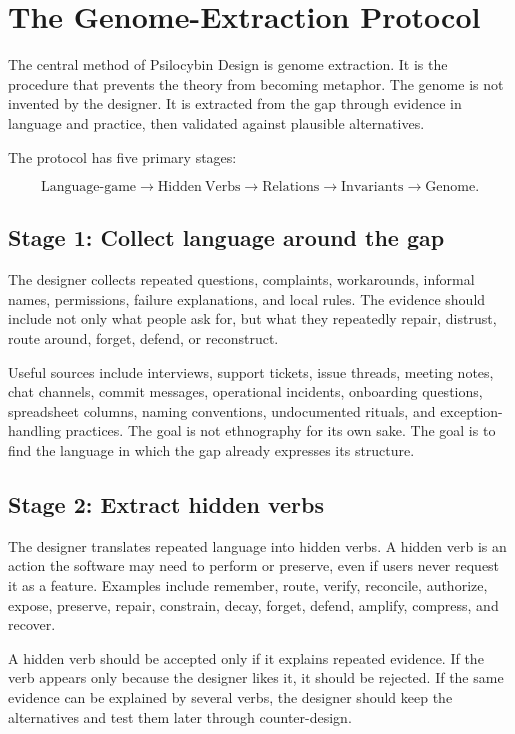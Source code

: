 \documentclass[11pt]{article}
\begin{document}
\section{The Genome-Extraction Protocol}

The central method of Psilocybin Design is genome extraction. It is the procedure that prevents the theory from becoming metaphor. The genome is not invented by the designer. It is extracted from the gap through evidence in language and practice, then validated against plausible alternatives.

The protocol has five primary stages:

\[
    \mathrm{Language\mbox{-}game} \rightarrow \mathrm{Hidden\ Verbs} \rightarrow \mathrm{Relations} \rightarrow \mathrm{Invariants} \rightarrow \mathrm{Genome}.
\]

\subsection{Stage 1: Collect language around the gap}

The designer collects repeated questions, complaints, workarounds, informal names, permissions, failure explanations, and local rules. The evidence should include not only what people ask for, but what they repeatedly repair, distrust, route around, forget, defend, or reconstruct.

Useful sources include interviews, support tickets, issue threads, meeting notes, chat channels, commit messages, operational incidents, onboarding questions, spreadsheet columns, naming conventions, undocumented rituals, and exception-handling practices. The goal is not ethnography for its own sake. The goal is to find the language in which the gap already expresses its structure.

\subsection{Stage 2: Extract hidden verbs}

The designer translates repeated language into hidden verbs. A hidden verb is an action the software may need to perform or preserve, even if users never request it as a feature. Examples include remember, route, verify, reconcile, authorize, expose, preserve, repair, constrain, decay, forget, defend, amplify, compress, and recover.

A hidden verb should be accepted only if it explains repeated evidence. If the verb appears only because the designer likes it, it should be rejected. If the same evidence can be explained by several verbs, the designer should keep the alternatives and test them later through counter-design.
\end{document}
